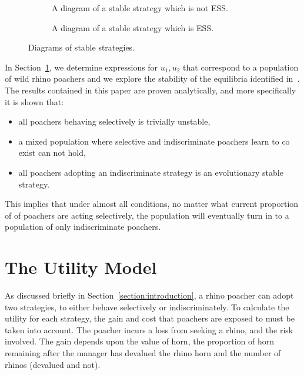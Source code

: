 \documentclass[10pt]{article}
\begin{document}
\begin{figure}[!htbp]
\begin{center}
    \begin{subfigure}{0.40\textwidth}
    
    \caption{\label{fig:stable_diagram} A diagram of a stable strategy which 
    is not ESS.}
    \end{subfigure}
    \begin{subfigure}{0.40\textwidth}
    
    \caption{\label{fig:ess_diagram}A diagram of a stable strategy which is ESS.}
    \end{subfigure}
        \caption{\label{fig:stable_ess_driagrams} Diagrams of stable strategies.}
\end{center}
\end{figure}

In Section~\ref{section:the_model}, we determine expressions
for \(u_1, u_2\) that correspond to a population of wild rhino poachers and we
explore the stability of the equilibria identified in~\cite{Lee}. The results
contained in this paper are proven analytically, and more specifically it is 
shown that:

\begin{itemize}
    \item all poachers behaving selectively is trivially unstable,  
    \item a mixed population where selective and indiscriminate poachers
          learn to co exist can not hold,
    \item all poachers adopting an indiscriminate strategy is an evolutionary 
          stable strategy.
\end{itemize}

This implies that under almost all conditions, no matter what current proportion 
of
of poachers are acting selectively, the population will eventually turn in to a 
population of only indiscriminate poachers.

\section{The Utility Model}\label{section:the_model}

As discussed briefly in Section~\ref{section:introduction}, a rhino poacher
can adopt two strategies, to either behave selectively
or indiscriminately. To calculate the utility for each strategy, the gain and cost
that poachers are exposed to must be taken into account. The poacher incurs a
loss from seeking a rhino, and the risk involved. The gain depends upon the value
of horn, the proportion of horn remaining after the manager has devalued the 
rhino horn and the number of rhinos (devalued and not).
\end{document}
